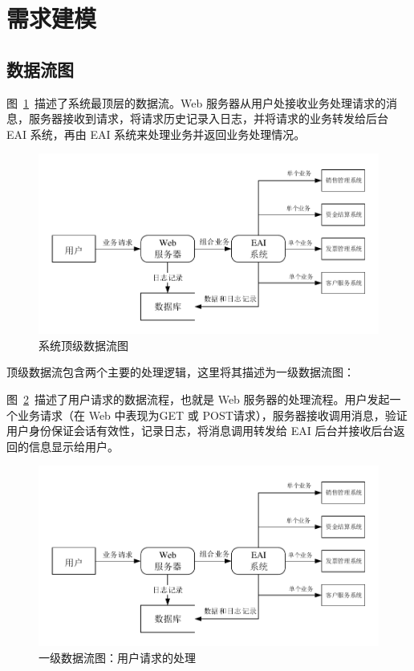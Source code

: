 \documentclass[cs4size,a4paper,nofonts]{ctexart}
\begin{document}
\section{需求建模}

\subsection{数据流图}

图~\ref{dfd0}~描述了系统最顶层的数据流。Web 服务器从用户处接收业务处理请求的消息，服务器接收到请求，将请求历史记录入日志，并将请求的业务转发给后台 EAI 系统，再由 EAI 系统来处理业务并返回业务处理情况。

\begin{figure}[htp]
\centering
\includegraphics[width=\textwidth,page=1]{images/dfd.pdf}
\caption{\label{dfd0}系统顶级数据流图}
\end{figure}

顶级数据流包含两个主要的处理逻辑，这里将其描述为一级数据流图：

图~\ref{dfd1.1}~描述了用户请求的数据流程，也就是 Web 服务器的处理流程。用户发起一个业务请求（在 Web 中表现为GET 或 POST请求），服务器接收调用消息，验证用户身份保证会话有效性，记录日志，将消息调用转发给 EAI 后台并接收后台返回的信息显示给用户。

\begin{figure}[htp]
\centering
\includegraphics[width=\textwidth,page=2]{images/dfd.pdf}
\caption{\label{dfd1.1}一级数据流图：用户请求的处理}
\end{figure}
\end{document}

